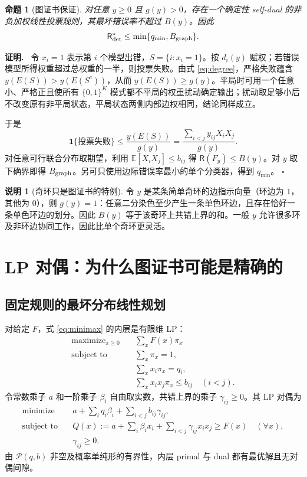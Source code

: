 \documentclass[11pt,a4paper]{ctexart}
\newtheorem{proposition}[theorem]{命题}
\theoremstyle{definition}
\newtheorem{remark}[theorem]{说明}
\newenvironment{proofcn}{\par\noindent\textbf{证明.}\ }{\hfill $\square$\par}
\newcommand{\PP}{\mathcal P}
\newcommand{\Risk}{\mathsf R}
\newcommand{\I}{\mathbf 1}
\newcommand{\E}{\mathbb E}
\begin{document}
\begin{proposition}[图证书保证]\label{prop:graph}
对任意 $y\ge0$ 且 $g(y)>0$，存在一个确定性 self-dual 的非负加权线性投票规则，其最坏错误率不超过 $B(y)$。因此
\begin{equation}\label{eq:ub}
\Risk^*_{\rm det}\le\min\{q_{\min},B_{\rm graph}\}.
\end{equation}
\end{proposition}
\begin{proofcn}
令 $x_i=1$ 表示第 $i$ 个模型出错，$S=\{i:x_i=1\}$。按 $d_i(y)$ 赋权；若错误模型所得权重超过总权重的一半，则投票失败。由式 \eqref{eq:degree}，严格失败蕴含 $y(E(S))>y(E(S^c))$，从而 $y(E(S))\ge g(y)$。平局时可用一个任意小、严格正且使所有 $\{0,1\}^K$ 模式都不平局的权重扰动确定输出；扰动取足够小后不改变原有非平局状态，平局状态两侧内部边权相同，结论同样成立。

于是
\[
\I\{\text{投票失败}\}\le\frac{y(E(S))}{g(y)}
=\frac{\sum_{i<j}y_{ij}X_iX_j}{g(y)}.
\]
对任意可行联合分布取期望，利用 $\E[X_iX_j]\le b_{ij}$ 得 $\Risk(F_y)\le B(y)$。对 $y$ 取下确界即得 $B_{\rm graph}$。另可只使用边际错误率最小的单个分类器，得到 $q_{\min}$。
\end{proofcn}

\begin{remark}[奇环只是图证书的特例]
令 $y$ 是某条简单奇环的边指示向量（环边为 $1$，其他为 $0$），则 $g(y)=1$：任意二分染色至少产生一条单色环边，且存在恰好一条单色环边的划分。因此 $B(y)$ 等于该奇环上共错上界的和。一般 $y$ 允许很多环及非环边协同工作，因此比单个奇环更灵活。
\end{remark}

\section{LP 对偶：为什么图证书可能是精确的}
\subsection{固定规则的最坏分布线性规划}
对给定 $F$，式 \eqref{eq:minimax} 的内层是有限维 LP：
\[
\begin{aligned}
\text{maximize}_{\pi\ge0}\quad &\sum_xF(x)\pi_x\\
\text{subject to}\quad &\sum_x\pi_x=1,\\
&\sum_xx_i\pi_x=q_i,\\
&\sum_xx_ix_j\pi_x\le b_{ij}\quad(i<j).
\end{aligned}
\]
令常数乘子 $a$ 和一阶乘子 $\beta_i$ 自由取实数，共错上界的乘子 $\gamma_{ij}\ge0$。其 LP 对偶为
\begin{equation}\label{eq:dualf}
\begin{aligned}
\text{minimize}\quad &a+\sum_iq_i\beta_i+\sum_{i<j}b_{ij}\gamma_{ij},\\
\text{subject to}\quad &Q(x):=a+\sum_i\beta_ix_i+\sum_{i<j}\gamma_{ij}x_ix_j\ge F(x)\quad(\forall x),\\
&\gamma_{ij}\ge0.
\end{aligned}
\end{equation}
由 $\PP(q,b)$ 非空及概率单纯形的有界性，内层 primal 与 dual 都有最优解且无对偶间隙。
\end{document}
